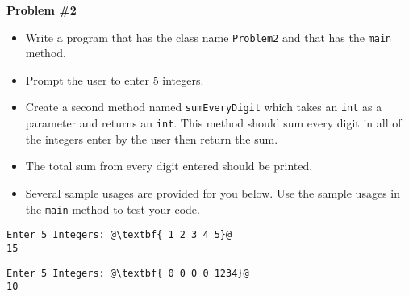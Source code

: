 \documentclass[12pt]{article}
\begin{document}
\vspace*{0.5cm}
\noindent\textbf{Problem \#2}
\begin{itemize}
	\item Write a program that has the class name \texttt{Problem2} and that has the \texttt{main} method. 
	\item Prompt the user to enter 5 integers.
	\item Create a second method named \texttt{sumEveryDigit} which takes an \texttt{int} as a parameter and returns an \texttt{int}. This method should sum every digit in all of the integers enter by the user then return the sum.
	\item The total sum from every digit entered should be printed.
	\item Several sample usages are provided for you below. Use the sample usages in the \texttt{main} method to test your code.
\end{itemize}
\begin{center}
\begin{minipage}{7cm}
\begin{lstlisting}[escapechar=@]
Enter 5 Integers: @\textbf{ 1 2 3 4 5}@
15
\end{lstlisting}
\end{minipage}
\hspace*{0.5cm}
\begin{minipage}{7cm}
\begin{lstlisting}[escapechar=@]
Enter 5 Integers: @\textbf{ 0 0 0 0 1234}@
10
\end{lstlisting}
\end{minipage}
\end{center}
\end{document}
